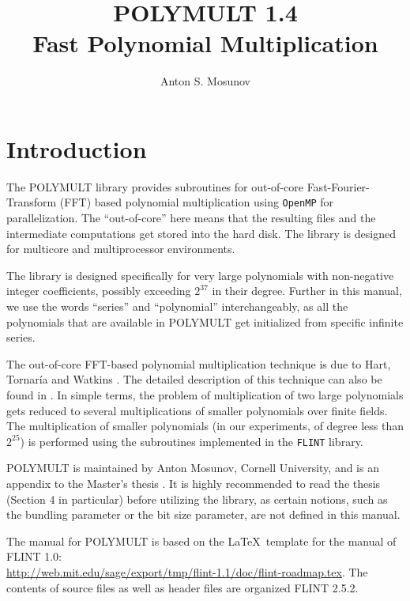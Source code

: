 \documentclass[a4paper,10pt]{article}
\title{POLYMULT 1.4\\Fast Polynomial Multiplication}
\author{Anton S. Mosunov}
\newcommand{\code}{\lstinline}
\begin{document}
\maketitle
\tableofcontents
\lstset{language=c}
\lstset{basicstyle=\ttfamily}
\lstset{keywordstyle=}
\lstset{escapeinside=\%\%}





\section{Introduction}

The POLYMULT library provides subroutines for out-of-core Fast-Fourier-Transform (FFT) based polynomial multiplication using \code{OpenMP} for parallelization. The ``out-of-core'' here means that the resulting files and the intermediate computations get stored into the hard disk. The library is designed for multicore and multiprocessor environments.

The library is designed specifically for very large polynomials with non-negative integer coefficients, possibly exceeding $2^{37}$ in their degree. Further in this manual, we use the words ``series'' and ``polynomial'' interchangeably, as all the polynomials that are available in POLYMULT get initialized from specific infinite series.

The out-of-core FFT-based polynomial multiplication technique is due to Hart, Tornar\'ia and Watkins \cite{hart}. The detailed description of this technique can also be found in \cite[Section 4]{mosunov}. In simple terms, the problem of multiplication of two large polynomials gets reduced to several multiplications of smaller polynomials over finite fields. The multiplication of smaller polynomials (in our experiments, of degree less than $2^{25}$) is performed using the subroutines implemented in the \code{FLINT} library.

POLYMULT is maintained by Anton Mosunov, Cornell University, and is an appendix to the Master's thesis \cite{mosunov}. It is highly recommended to read the thesis (Section 4 in particular) before utilizing the library, as certain notions, such as the bundling parameter or the bit size parameter, are not defined in this manual.

The manual for POLYMULT is based on the \LaTeX \, template for the manual of FLINT 1.0:\\\url{http://web.mit.edu/sage/export/tmp/flint-1.1/doc/flint-roadmap.tex}. The contents of source files as well as header files are organized FLINT 2.5.2.
\end{document}
